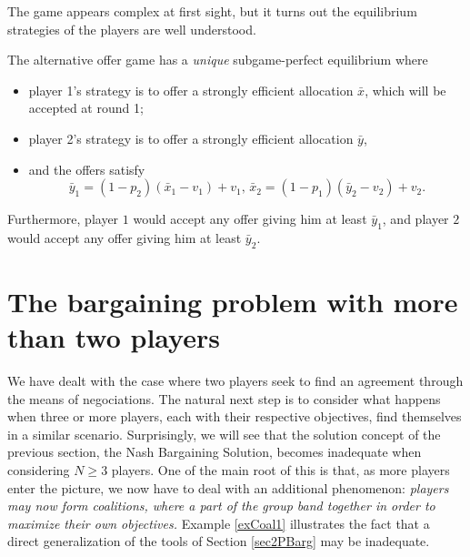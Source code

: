 The game appears complex at first sight, but it turns out the equilibrium strategies of the players are well understood.

\begin{theorem}
The alternative offer game has a \emph{unique} subgame-perfect equilibrium where
\begin{itemize}
\item player 1's strategy is to offer a strongly efficient allocation $\bar{x}$, which will be accepted at round 1;
\item player 2's strategy is to offer a strongly efficient allocation $\bar{y}$,
\item and the offers satisfy $$\bar{y}_1 = (1-p_2)(\bar{x}_1 - v_1) + v_1, \, \bar{x}_2 = (1-p_1)(\bar{y}_2 - v_2) + v_2. $$
\end{itemize}
Furthermore, player $1$ would accept any offer giving him at least $\bar{y}_1$, and player $2$ would accept any offer giving him at least $\bar{y}_2$.
\end{theorem}




\section{The bargaining problem with more than two players}


We have dealt with the case where two players seek to find an agreement through the means of negociations. The natural next step is to consider what happens when three or more players, each with their respective objectives, find themselves in a similar scenario. Surprisingly, we will see that the solution concept of the previous section, the Nash Bargaining Solution, becomes inadequate when considering $N \geq 3$ players. One of the main root of this is that, as more players enter the picture, we now have to deal with an additional phenomenon: \emph{players may now form coalitions, where a part of the group band together in order to maximize their own objectives.}
Example \ref{exCoal1} illustrates the fact that a direct generalization of the tools of Section \ref{sec2PBarg} may be inadequate.

